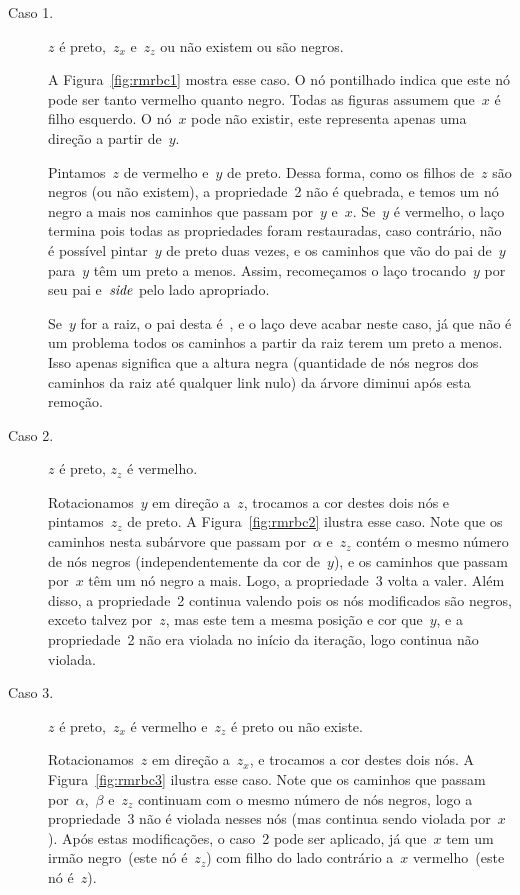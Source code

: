 \documentclass[main.tex]{subfiles}
\begin{document}
\begin{description}
	\item[Caso 1.] $z$ é preto,~$z_x$ e~$z_z$ ou não existem ou são negros.

	A Figura~\ref{fig:rmrbc1} mostra esse caso. O nó pontilhado indica que este nó pode ser tanto vermelho quanto negro. Todas as figuras assumem que~$x$ é filho esquerdo. O nó~$x$ pode não existir, este representa apenas uma direção a partir de~$y$.

	Pintamos~$z$ de vermelho e~$y$ de preto. Dessa forma, como os filhos de~$z$ são negros (ou não existem), a propriedade~2 não é quebrada, e temos um nó negro a mais nos caminhos que passam por~$y$ e~$x$. Se~$y$ é vermelho, o laço termina pois todas as propriedades foram restauradas, caso contrário, não é possível pintar~$y$ de preto duas vezes, e os caminhos que vão do pai de~$y$ para~$y$ têm um preto a menos. Assim, recomeçamos o laço trocando~$y$ por seu pai e~$\mathit{side}$ pelo lado apropriado.

	Se~$y$ for a raiz, o pai desta é~, e o laço deve acabar neste caso, já que não é um problema todos os caminhos a partir da raiz terem um preto a menos. Isso apenas significa que a altura negra (quantidade de nós negros dos caminhos da raiz até qualquer link nulo) da árvore diminui após esta remoção. %

	\item[Caso 2.] $z$ é preto, $z_z$ é vermelho.

	Rotacionamos~$y$ em direção a~$z$, trocamos a cor destes dois nós e pintamos~$z_z$ de preto. A Figura~\ref{fig:rmrbc2} ilustra esse caso. Note que os caminhos nesta subárvore que passam por~$\alpha$ e~$z_z$ contém o mesmo número de nós negros (independentemente da cor de~$y$), e os caminhos que passam por~$x$ têm um nó negro a mais. Logo, a propriedade~3 volta a valer. Além disso, a propriedade~2 continua valendo pois os nós modificados são negros, exceto talvez por~$z$, mas este tem a mesma posição e cor que~$y$, e a propriedade~2 não era violada no início da iteração, logo continua não violada.

	\item[Caso 3.] $z$ é preto,~$z_x$ é vermelho e~$z_z$ é preto ou não existe.

	Rotacionamos~$z$ em direção a~$z_x$, e trocamos a cor destes dois nós. A Figura~\ref{fig:rmrbc3} ilustra esse caso. Note que os caminhos que passam por~$\alpha$,~$\beta$ e~$z_z$ continuam com o mesmo número de nós negros, logo a propriedade~3 não é violada nesses nós (mas continua sendo violada por~$x$). Após estas modificações, o caso~2 pode ser aplicado, já que~$x$ tem um irmão negro~(este nó é~$z_z$) com filho do lado contrário a~$x$ vermelho~(este nó é~$z$).


\end{description}
\end{document}

